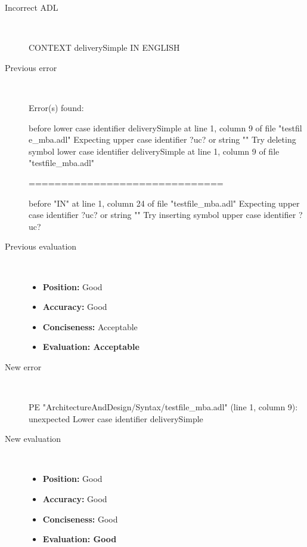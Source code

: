 \hrulefill

\begin{description}
  \item[Incorrect ADL]~\\
\begin{adl}
CONTEXT deliverySimple IN ENGLISH\end{adl}
  \item[Previous error]~\\
\begin{haskell}
Error(s) found:

before lower case identifier deliverySimple at line 1, column 9 of file "testfil
e_mba.adl"
Expecting upper case identifier ?uc? or string ""
Try deleting symbol lower case identifier deliverySimple at line 1, column 9 of
file "testfile_mba.adl"

==============================

before "IN" at line 1, column 24 of file "testfile_mba.adl"
Expecting upper case identifier ?uc? or string ""
Try inserting symbol upper case identifier ?uc?\end{haskell}
  \item[Previous evaluation]~\\
    \begin{itemize}
    \item \textbf{Position:} Good
    \item \textbf{Accuracy:} Good
    \item \textbf{Conciseness:} Acceptable
    \item \textbf{Evaluation: Acceptable}
    \end{itemize}
  \item[New error]~\\
\begin{haskell}
PE "ArchitectureAndDesign/Syntax/testfile_mba.adl" (line 1, column 9):
unexpected Lower case identifier deliverySimple\end{haskell}
  \item[New evaluation]~\\
    \begin{itemize}
    \item \textbf{Position:} Good
    \item \textbf{Accuracy:} Good
    \item \textbf{Conciseness:} Good
    \item \textbf{Evaluation: Good}
    \end{itemize}
  \end{description}

